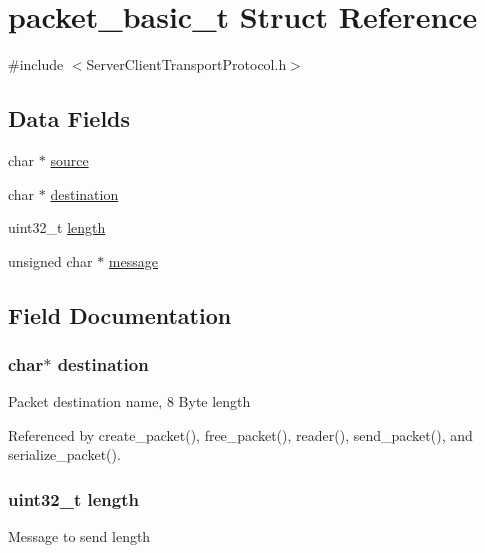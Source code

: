 \hypertarget{structpacket__basic__t}{}\section{packet\+\_\+basic\+\_\+t Struct Reference}
\label{structpacket__basic__t}


{\ttfamily \#include $<$Server\+Client\+Transport\+Protocol.\+h$>$}

\subsection*{Data Fields}
\begin{DoxyCompactItemize}
\item 
char $\ast$ \hyperlink{structpacket__basic__t_aee6937c81d468a0915308234d09d212c}{source}
\item 
char $\ast$ \hyperlink{structpacket__basic__t_ae98a0878a8abb793b89317d904f8c00a}{destination}
\item 
uint32\+\_\+t \hyperlink{structpacket__basic__t_aebb70c2aab3407a9f05334c47131a43b}{length}
\item 
unsigned char $\ast$ \hyperlink{structpacket__basic__t_abb13456032cf48eaa794391b6ed937c7}{message}
\end{DoxyCompactItemize}


\subsection{Field Documentation}
\subsubsection[{\texorpdfstring{destination}{destination}}]{\setlength{\rightskip}{0pt plus 5cm}char$\ast$ destination}\hypertarget{structpacket__basic__t_ae98a0878a8abb793b89317d904f8c00a}{}\label{structpacket__basic__t_ae98a0878a8abb793b89317d904f8c00a}
Packet destination name, 8 Byte length 

Referenced by create\+\_\+packet(), free\+\_\+packet(), reader(), send\+\_\+packet(), and serialize\+\_\+packet().

\subsubsection[{\texorpdfstring{length}{length}}]{\setlength{\rightskip}{0pt plus 5cm}uint32\+\_\+t length}\hypertarget{structpacket__basic__t_aebb70c2aab3407a9f05334c47131a43b}{}\label{structpacket__basic__t_aebb70c2aab3407a9f05334c47131a43b}
Message to send length 

